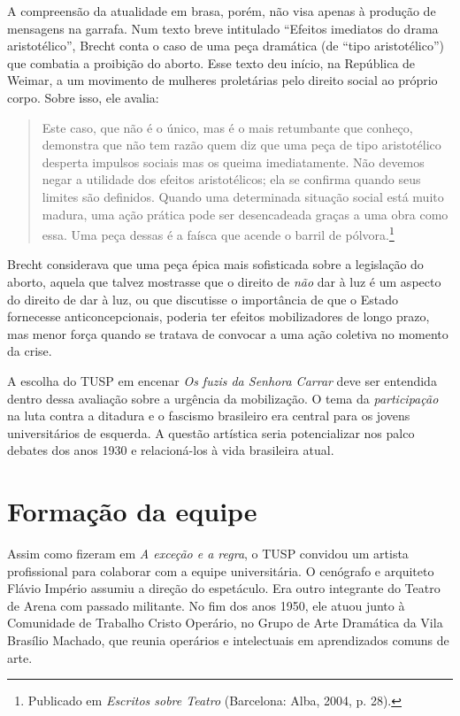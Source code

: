 A compreensão da atualidade em brasa, porém, não visa apenas à produção
de mensagens na garrafa. Num texto breve intitulado “Efeitos imediatos
do drama aristotélico”, Brecht conta o caso de uma peça dramática (de
“tipo aristotélico”) que combatia a proibição do aborto. Esse texto deu
início, na República de Weimar, a um movimento de mulheres proletárias
pelo direito social ao próprio corpo. Sobre isso, ele avalia:

\begin{quote}
Este caso, que não é o único, mas é o mais retumbante que conheço,
demonstra que não tem razão quem diz que uma peça de tipo aristotélico
desperta impulsos sociais mas os queima imediatamente. Não devemos negar
a utilidade dos efeitos aristotélicos; ela se confirma quando seus
limites são definidos. Quando uma determinada situação social está muito
madura, uma ação prática pode ser desencadeada graças a uma obra como
essa. Uma peça dessas é a faísca que acende o barril de
pólvora.\footnote{Publicado em \textit{Escritos sobre Teatro} (Barcelona:
  Alba, 2004, p. 28).}
\end{quote}

Brecht considerava que uma peça épica mais sofisticada sobre a
legislação do aborto, aquela que talvez mostrasse que o direito de
\textit{não} dar à luz é um aspecto do direito de dar à luz, ou que
discutisse o importância de que o Estado fornecesse anticoncepcionais,
poderia ter efeitos mobilizadores de longo prazo, mas menor força quando
se tratava de convocar a uma ação coletiva no momento da crise.

A escolha do TUSP em encenar \textit{Os fuzis da Senhora Carrar} deve ser
entendida dentro dessa avaliação sobre a urgência da mobilização. O tema
da \textit{participação} na luta contra a ditadura e o fascismo brasileiro
era central para os jovens universitários de esquerda. A questão
artística seria potencializar nos palco debates dos anos 1930 e
relacioná-los à vida brasileira atual.

\section{Formação da equipe}

Assim como fizeram em \textit{A exceção e a regra}, o TUSP convidou um
artista profissional para colaborar com a equipe universitária. O
cenógrafo e arquiteto Flávio Império assumiu a direção do espetáculo.
Era outro integrante do Teatro de Arena com passado militante. No fim
dos anos 1950, ele atuou junto à Comunidade de Trabalho Cristo Operário,
no Grupo de Arte Dramática da Vila Brasílio Machado, que reunia
operários e intelectuais em aprendizados comuns de arte.


